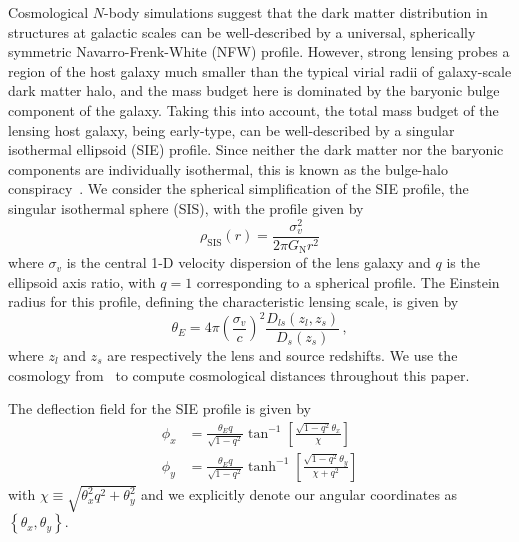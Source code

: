 \documentclass[twocolumn]{aastex62}
\begin{document}
Cosmological $N$-body simulations suggest that the dark matter distribution in structures at galactic scales can be well-described by a universal, spherically symmetric Navarro-Frenk-White (NFW) profile. However, strong lensing probes a region of the host galaxy much smaller than the typical virial radii of galaxy-scale dark matter halo, and the mass budget here is dominated by the baryonic bulge component of the galaxy. Taking this into account, the total mass budget of the lensing host galaxy, being early-type, can be well-described by a singular isothermal ellipsoid (SIE) profile. Since neither the dark matter nor the baryonic components are individually isothermal, this is known as the bulge-halo conspiracy~\citep{1003.5567}. We consider the spherical simplification of the SIE profile, the singular isothermal sphere (SIS), with the profile given by~\citep{1994A&A...284..285K,1003.5567}
\begin{equation}
\rho_\mathrm{SIS}(r)=\frac{\sigma_{v}^{2}}{2 \pi G_\mathrm{N} r^2}
\label{eq:hostprofile}
\end{equation}
where $\sigma_{v}$ is the central 1-D velocity dispersion of the lens galaxy and $q$ is the ellipsoid axis ratio, with $q=1$ corresponding to a spherical profile. The Einstein radius for this profile, defining the characteristic lensing scale, is given by~\citep{1003.5567}
\begin{equation}
\theta_{{E}}=4 \pi\left(\frac{\sigma_{v}}{c}\right)^{2} \frac{D_{l s}\left(z_{l}, z_{s}\right)}{D_{s}\left(z_{s}\right)} \,,
\label{eq:siethetae}
\end{equation}
where $z_{l}$ and $z_{s}$ are respectively the lens and source redshifts. We use the cosmology from~\citet{1502.01589} to compute cosmological distances throughout this paper.

The deflection field for the SIE profile is given by~\citep{2001astro.ph..2341K}
\begin{align}
\phi_{x} &=\frac{\theta_E q}{\sqrt{1-q^{2}}} \tan ^{-1}\left[\frac{\sqrt{1-q^{2}} \theta_x}{\chi}\right] \\
\phi_{y} &=\frac{\theta_E q}{\sqrt{1-q^{2}}} \tanh ^{-1}\left[\frac{\sqrt{1-q^{2}} \theta_y}{\chi+q^{2} }\right]
\end{align}
with $\chi \equiv \sqrt{\theta_x^2 q^2 + \theta_y^2}$ and we explicitly denote our angular coordinates as $\left\{\theta_x, \theta_y\right\}$.
\end{document}
